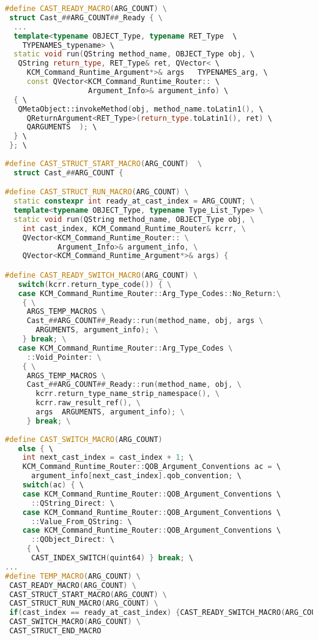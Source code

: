 \begin{lstlisting}[caption={Sample Code Graph Evaluator}, 
  language = C++, numbers = none, label={lst:rzsem},
    basicstyle = \ttfamily\bfseries\footnotesize, linewidth = \linewidth]
#define CAST_READY_MACRO(ARG_COUNT) \
 struct Cast_##ARG_COUNT##_Ready { \
  ...
  template<typename OBJECT_Type, typename RET_Type  \
    TYPENAMES_typename> \
  static void run(QString method_name, OBJECT_Type obj, \
   QString return_type, RET_Type& ret, QVector< \
     KCM_Command_Runtime_Argument*>& args   TYPENAMES_arg, \
     const QVector<KCM_Command_Runtime_Router:: \
                   Argument_Info>& argument_info) \
  { \
   QMetaObject::invokeMethod(obj, method_name.toLatin1(), \
     QReturnArgument<RET_Type>(return_type.toLatin1(), ret) \
     QARGUMENTS  ); \
  } \
 }; \
 
#define CAST_STRUCT_START_MACRO(ARG_COUNT)  \
  struct Cast_##ARG_COUNT { 

#define CAST_STRUCT_RUN_MACRO(ARG_COUNT) \
  static constexpr int ready_at_cast_index = ARG_COUNT; \
  template<typename OBJECT_Type, typename Type_List_Type> \
  static void run(QString method_name, OBJECT_Type obj, \
    int cast_index, KCM_Command_Runtime_Router& kcrr, \
    QVector<KCM_Command_Runtime_Router:: \
            Argument_Info>& argument_info, \
    QVector<KCM_Command_Runtime_Argument*>& args) { 

#define CAST_READY_SWITCH_MACRO(ARG_COUNT) \
   switch(kcrr.return_type_code()) { \
   case KCM_Command_Runtime_Router::Arg_Type_Codes::No_Return:\
    { \
     ARGS_TEMP_MACROS \
     Cast_##ARG_COUNT##_Ready::run(method_name, obj, args \
       ARGUMENTS, argument_info); \
    } break; \
   case KCM_Command_Runtime_Router::Arg_Type_Codes \
     ::Void_Pointer: \
    { \
     ARGS_TEMP_MACROS \
     Cast_##ARG_COUNT##_Ready::run(method_name, obj, \
       kcrr.return_type_name_strip_namespace(), \
       kcrr.raw_result_ref(), \
       args  ARGUMENTS, argument_info); \
     } break; \
 
#define CAST_SWITCH_MACRO(ARG_COUNT)                 
   else { \
    int next_cast_index = cast_index + 1; \
    KCM_Command_Runtime_Router::QOB_Argument_Conventions ac = \
      argument_info[next_cast_index].qob_convention; \
    switch(ac) { \
    case KCM_Command_Runtime_Router::QOB_Argument_Conventions \
      ::QString_Direct: \
    case KCM_Command_Runtime_Router::QOB_Argument_Conventions \
      ::Value_From_QString: \
    case KCM_Command_Runtime_Router::QOB_Argument_Conventions \
      ::QObject_Direct: \
     { \
      CAST_INDEX_SWITCH(quint64) } break; \
...
#define TEMP_MACRO(ARG_COUNT) \
 CAST_READY_MACRO(ARG_COUNT) \
 CAST_STRUCT_START_MACRO(ARG_COUNT) \
 CAST_STRUCT_RUN_MACRO(ARG_COUNT) \
 if(cast_index == ready_at_cast_index) {CAST_READY_SWITCH_MACRO(ARG_COUNT)} \
 CAST_SWITCH_MACRO(ARG_COUNT) \
 CAST_STRUCT_END_MACRO


\end{lstlisting}
